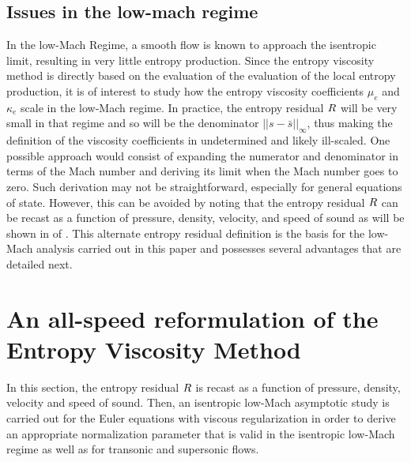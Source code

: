 \subsection{Issues in the low-mach regime} 
In the low-Mach Regime, a smooth flow is known to approach the isentropic limit, resulting in very little 
entropy production. Since the entropy viscosity method is directly based on the evaluation of the evaluation of the local entropy production, it is of interest to study how the entropy viscosity coefficients $\mu_e$ and $\kappa_e$ scale in the low-Mach regime. In practice, the entropy residual $R$ will be very small in that regime and so will be the denominator $|| s - \bar{s} ||_\infty$, thus making the definition of the viscosity coefficients in  undetermined and likely ill-scaled.  One possible approach would consist of expanding the numerator and denominator in terms of the Mach number and deriving its limit when the Mach number goes to zero. Such derivation may not be straightforward, especially for general equations of state. However, this can be avoided by noting that the entropy residual $R$ can be recast as a function of pressure, density, velocity, and speed of sound as will be shown in  of . This alternate entropy residual definition is the basis for the low-Mach analysis carried out in this paper and possesses several advantages that are detailed next. %

\section{An all-speed reformulation of the Entropy Viscosity Method} \label{sec:extension}

In this section, the entropy residual $R$ is recast as a function of pressure, density, velocity and speed of sound. Then, an isentropic low-Mach asymptotic study is carried out for the Euler equations with viscous regularization in order to derive an appropriate normalization parameter that is valid in the isentropic low-Mach regime as well as for transonic and supersonic flows. 

